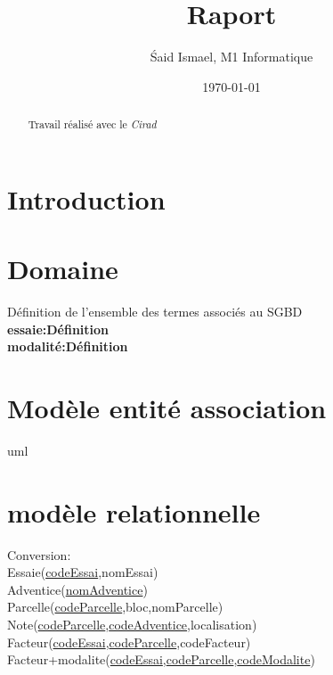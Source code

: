 \documentclass{article}
\title{Raport}
\author{\'Said Ismael, M1 Informatique}
\date{\today}
\begin{document}
\maketitle %


\begin{abstract}
  Travail réalisé avec le \textit{Cirad}~\cite{coursera}
\end{abstract}


\section{Introduction}
\section{Domaine}
Définition de l'ensemble des termes associés au SGBD \\ 
\textbf{essaie:Définition}
\\\textbf{modalité:Définition}
\section{Modèle entité association}
uml 

\section{modèle relationnelle}
Conversion:\\
Essaie(\underline{codeEssai},nomEssai)\\
Adventice(\underline{nomAdventice}) \\
Parcelle(\underline{codeParcelle},bloc,nomParcelle)\\
Note(\underline{codeParcelle},\underline{codeAdventice},localisation)\\
Facteur(\underline{codeEssai},\underline{codeParcelle},codeFacteur) \\
Facteur+modalite(\underline{codeEssai},\underline{codeParcelle},\underline{codeModalite}) \\





\end{document}
